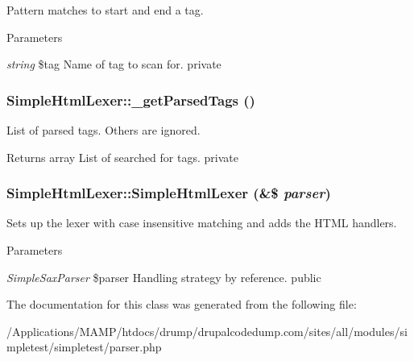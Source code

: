 \label{class_simple_html_lexer_a75ea520f6f309214e4dbd26579ef8e41}
Pattern matches to start and end a tag. 
\begin{DoxyParams}{Parameters}
\item[{\em string}]\$tag Name of tag to scan for.  private \end{DoxyParams}
\hypertarget{class_simple_html_lexer_aa52514ac1aa91a058c2aba5f8c5ee42e}{
\subsubsection[{\_\-getParsedTags}]{\setlength{\rightskip}{0pt plus 5cm}SimpleHtmlLexer::\_\-getParsedTags ()}}
\label{class_simple_html_lexer_aa52514ac1aa91a058c2aba5f8c5ee42e}
List of parsed tags. Others are ignored. \begin{DoxyReturn}{Returns}
array List of searched for tags.  private 
\end{DoxyReturn}
\hypertarget{class_simple_html_lexer_a75484f1b502fb907157326938b7709c6}{
\subsubsection[{SimpleHtmlLexer}]{\setlength{\rightskip}{0pt plus 5cm}SimpleHtmlLexer::SimpleHtmlLexer (\&\$ {\em parser})}}
\label{class_simple_html_lexer_a75484f1b502fb907157326938b7709c6}
Sets up the lexer with case insensitive matching and adds the HTML handlers. 
\begin{DoxyParams}{Parameters}
\item[{\em SimpleSaxParser}]\$parser Handling strategy by reference.  public \end{DoxyParams}


The documentation for this class was generated from the following file:\begin{DoxyCompactItemize}
\item 
/Applications/MAMP/htdocs/drump/drupalcodedump.com/sites/all/modules/simpletest/simpletest/parser.php\end{DoxyCompactItemize}
